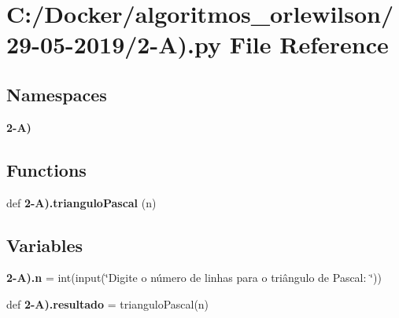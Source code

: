 \section{C\+:/\+Docker/algoritmos\+\_\+orlewilson/29-\/05-\/2019/2-\/A).py File Reference}
\label{2-_a_08_8py}
\subsection*{Namespaces}
\begin{DoxyCompactItemize}
\item 
 \textbf{ 2-\/\+A)}
\end{DoxyCompactItemize}
\subsection*{Functions}
\begin{DoxyCompactItemize}
\item 
def \textbf{ 2-\/\+A).\+triangulo\+Pascal} (n)
\end{DoxyCompactItemize}
\subsection*{Variables}
\begin{DoxyCompactItemize}
\item 
\textbf{ 2-\/\+A).\+n} = int(input(\char`\"{}Digite o número de linhas para o triângulo de Pascal\+: \char`\"{}))
\item 
def \textbf{ 2-\/\+A).\+resultado} = triangulo\+Pascal(n)
\end{DoxyCompactItemize}
